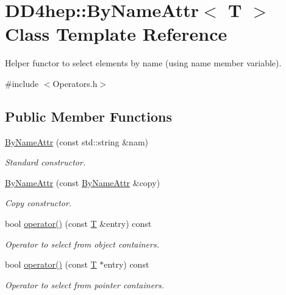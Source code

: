 \hypertarget{class_d_d4hep_1_1_by_name_attr}{
\section{DD4hep::ByNameAttr$<$ T $>$ Class Template Reference}
\label{class_d_d4hep_1_1_by_name_attr}
}


Helper functor to select elements by name (using name member variable).  


{\ttfamily \#include $<$Operators.h$>$}\subsection*{Public Member Functions}
\begin{DoxyCompactItemize}
\item 
\hyperlink{class_d_d4hep_1_1_by_name_attr_a69abb8e2cf258848ca9b19ef02082fde}{ByNameAttr} (const std::string \&nam)
\begin{DoxyCompactList}\small\item\em Standard constructor. \item\end{DoxyCompactList}\item 
\hyperlink{class_d_d4hep_1_1_by_name_attr_a782ea1d32c95453edfa5da378770d03a}{ByNameAttr} (const \hyperlink{class_d_d4hep_1_1_by_name_attr}{ByNameAttr} \&copy)
\begin{DoxyCompactList}\small\item\em Copy constructor. \item\end{DoxyCompactList}\item 
bool \hyperlink{class_d_d4hep_1_1_by_name_attr_a566d63995ef9b292ffb98eaaf54273fe}{operator()} (const \hyperlink{class_t}{T} \&entry) const 
\begin{DoxyCompactList}\small\item\em Operator to select from object containers. \item\end{DoxyCompactList}\item 
bool \hyperlink{class_d_d4hep_1_1_by_name_attr_a8243b550e4ecfef956a8ef9e75be78c8}{operator()} (const \hyperlink{class_t}{T} $\ast$entry) const 
\begin{DoxyCompactList}\small\item\em Operator to select from pointer containers. \item\end{DoxyCompactList}\end{DoxyCompactItemize}
